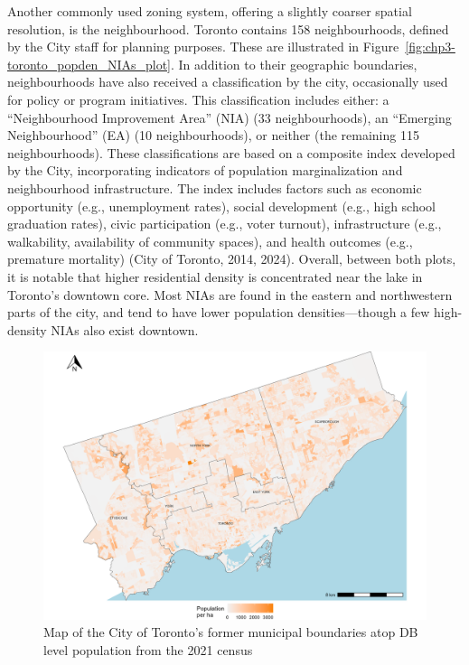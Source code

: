 \documentclass[
11pt, %
oneside, %
english, %
singlespacing, %
]{macthesis} %
\begin{document}
Another commonly used zoning system, offering a slightly coarser spatial resolution, is the neighbourhood. Toronto contains 158 neighbourhoods, defined by the City staff for planning purposes. These are illustrated in Figure~\ref{fig:chp3-toronto_popden_NIAs_plot}. In addition to their geographic boundaries, neighbourhoods have also received a classification by the city, occasionally used for policy or program initiatives. This classification includes either: a ``Neighbourhood Improvement Area'' (NIA) (33 neighbourhoods), an ``Emerging Neighbourhood'' (EA) (10 neighbourhoods), or neither (the remaining 115 neighbourhoods). These classifications are based on a composite index developed by the City, incorporating indicators of population marginalization and neighbourhood infrastructure. The index includes factors such as economic opportunity (e.g., unemployment rates), social development (e.g., high school graduation rates), civic participation (e.g., voter turnout), infrastructure (e.g., walkability, availability of community spaces), and health outcomes (e.g., premature mortality) (City of Toronto, 2014, 2024). Overall, between both plots, it is notable that higher residential density is concentrated near the lake in Toronto's downtown core. Most NIAs are found in the eastern and northwestern parts of the city, and tend to have lower population densities---though a few high-density NIAs also exist downtown.

\begin{figure}

{\centering \includegraphics[width=6in]{./data/figures/chp3-former_muni_boundaries_plot} 

}

\caption{\label{fig:chp3-former_muni_boundaries_plot}Map of the City of Toronto's former municipal boundaries atop DB level population from the 2021 census}\label{fig:unnamed-chunk-43}
\end{figure}
\end{document}
